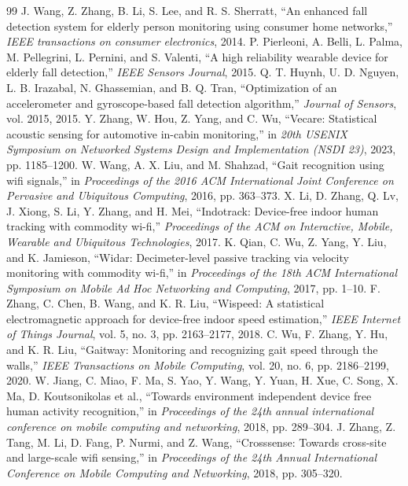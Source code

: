 \documentclass[UTF8,twocolumn]{ctexart}
\begin{document}
\begin{thebibliography}{99}
 J. Wang, Z. Zhang, B. Li, S. Lee, and R. S. Sherratt, “An enhanced fall detection system for elderly person monitoring using consumer home networks,” \emph{IEEE transactions on consumer electronics}, 2014.
 P. Pierleoni, A. Belli, L. Palma, M. Pellegrini, L. Pernini, and S. Valenti, “A high reliability wearable device for elderly fall detection,” \emph{IEEE Sensors Journal}, 2015.
 Q. T. Huynh, U. D. Nguyen, L. B. Irazabal, N. Ghassemian, and B. Q. Tran, “Optimization of an accelerometer and gyroscope-based fall detection algorithm,” \emph{Journal of Sensors}, vol. 2015, 2015.
 Y. Zhang, W. Hou, Z. Yang, and C. Wu, “Vecare: Statistical acoustic sensing for automotive in-cabin monitoring,” in \emph{20th USENIX Symposium on Networked Systems Design and Implementation (NSDI 23)}, 2023, pp. 1185–1200.
 W. Wang, A. X. Liu, and M. Shahzad, “Gait recognition using wifi signals,” in \emph{Proceedings of the 2016 ACM International Joint Conference on Pervasive and Ubiquitous Computing}, 2016, pp. 363–373.
 X. Li, D. Zhang, Q. Lv, J. Xiong, S. Li, Y. Zhang, and H. Mei, “Indotrack: Device-free indoor human tracking with commodity wi-fi,” \emph{Proceedings of the ACM on Interactive, Mobile, Wearable and Ubiquitous Technologies}, 2017.
 K. Qian, C. Wu, Z. Yang, Y. Liu, and K. Jamieson, “Widar: Decimeter-level passive tracking via velocity monitoring with commodity wi-fi,” in \emph{Proceedings of the 18th ACM International Symposium on Mobile Ad Hoc Networking and Computing}, 2017, pp. 1–10.
 F. Zhang, C. Chen, B. Wang, and K. R. Liu, “Wispeed: A statistical electromagnetic approach for device-free indoor speed estimation,” \emph{IEEE Internet of Things Journal}, vol. 5, no. 3, pp. 2163–2177, 2018.
 C. Wu, F. Zhang, Y. Hu, and K. R. Liu, “Gaitway: Monitoring and recognizing gait speed through the walls,” \emph{IEEE Transactions on Mobile Computing}, vol. 20, no. 6, pp. 2186–2199, 2020.
 W. Jiang, C. Miao, F. Ma, S. Yao, Y. Wang, Y. Yuan, H. Xue, C. Song, X. Ma, D. Koutsonikolas et al., “Towards environment independent device free human activity recognition,” in \emph{Proceedings of the 24th annual international conference on mobile computing and networking}, 2018, pp. 289–304.
 J. Zhang, Z. Tang, M. Li, D. Fang, P. Nurmi, and Z. Wang, “Crosssense: Towards cross-site and large-scale wifi sensing,” in \emph{Proceedings of the 24th Annual International Conference on Mobile Computing and Networking}, 2018, pp. 305–320.

\end{thebibliography}
\end{document}
